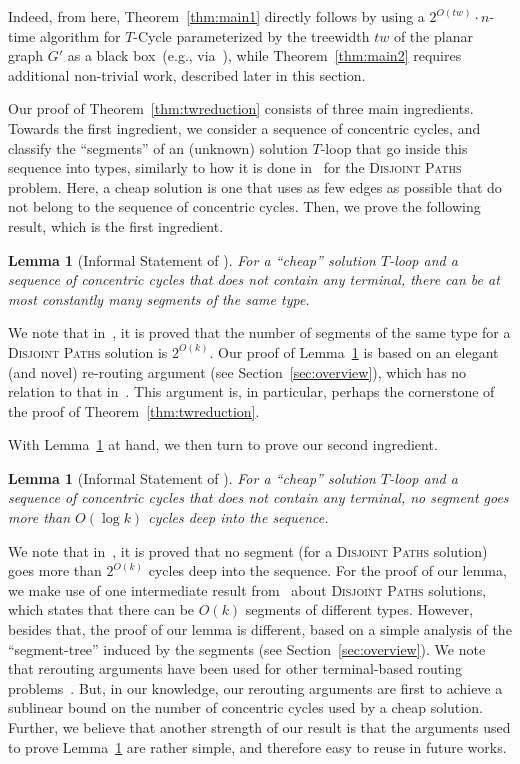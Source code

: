 \documentclass{article}
\newtheorem{lemma}[theorem]{Lemma}
\numberwithin{claimcounter}{lemma}
\newcommand{\dispaths}{\textsc{Disjoint Paths}\xspace}
\begin{document}
Indeed, from here, Theorem~\ref{thm:main1} directly follows by using a $2^{O(tw)}\cdot n$-time algorithm for {\sc $T$-Cycle} parameterized by the treewidth $tw$ of the planar graph $G'$ as a black box~(e.g., via~\cite{DBLP:journals/jcss/DornFT12}), while Theorem~\ref{thm:main2} requires additional non-trivial work, described later in this section.

Our proof of Theorem~\ref{thm:twreduction} consists of three main ingredients. Towards the first ingredient, we consider a sequence of concentric cycles, and classify the ``segments'' of an (unknown) solution $T$-loop that go inside this sequence into types, similarly to how it is done in~\cite{JCTB} for the \dispaths problem. Here, a cheap solution is one that uses as few edges as possible that do not belong to the sequence of concentric cycles. Then, we prove the following result, which is the first ingredient.
\begin{lemma}[Informal Statement of ]\label{lem:segmentTypes}
For a ``cheap'' solution $T$-loop and a sequence of concentric cycles that does not contain any terminal,  there can be at most constantly many segments of the same type.
\end{lemma}

We note that in~\cite{JCTB}, it is proved that the number of segments of the same type for a \dispaths solution is  $2^{O(k)}$. Our proof of Lemma~\ref{lem:segmentTypes} is based on an elegant (and novel)  re-routing argument   (see Section~\ref{sec:overview}), which has no relation to that in~\cite{JCTB}.  This argument is, in particular, perhaps the cornerstone  of the proof of Theorem~\ref{thm:twreduction}. 

With Lemma~\ref{lem:segmentTypes} at hand, we then turn to prove our second ingredient. 

\begin{lemma}[Informal Statement of ]\label{lem:segmentNumber}
For a ``cheap'' solution $T$-loop and a sequence of concentric cycles that does not contain any terminal,  no segment goes more than $O(\log k)$ cycles deep into the sequence.
\end{lemma}

We note that in~\cite{JCTB}, it is proved that no segment (for a \dispaths solution) goes more than $2^{O(k)}$ cycles deep into the sequence. For the proof of our lemma, we make use of one intermediate result from~\cite{JCTB} about \dispaths solutions, which states that there can be  $O(k)$ segments of different types. However, besides that, the proof of our lemma is different, based on a simple analysis of the ``segment-tree'' induced by the segments (see Section~\ref{sec:overview}). We note that  rerouting arguments have been used for other terminal-based routing problems~\cite{kobayashi2009algorithms}. But, in our knowledge, our rerouting arguments are first to achieve a sublinear bound on the number of concentric cycles used by a cheap solution. Further, we believe that another strength of our result is that the arguments used to prove Lemma~\ref{lem:segmentNumber} are rather simple, and therefore easy to reuse in future works.
\end{document}
